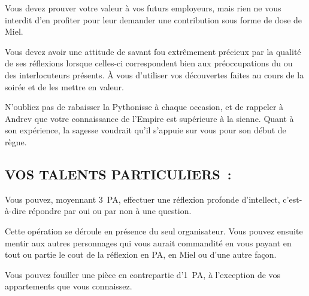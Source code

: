 \documentclass[14pt,twocolumn]{extarticle}
\begin{document}
Vous devez prouver votre valeur à vos futurs employeurs, mais rien ne vous
interdit d'en profiter pour leur demander une contribution sous forme de dose
de Miel.

Vous devez avoir une attitude de savant fou extrêmement précieux par la qualité
de ses réflexions lorsque celles-ci correspondent bien aux préoccupations du ou
des interlocuteurs présents. À vous d'utiliser vos découvertes faites au cours
de la soirée et de les mettre en valeur.

N'oubliez pas de rabaisser la Pythonisse à chaque occasion, et de rappeler à
Andrev que votre connaissance de l'Empire est supérieure à la sienne. Quant à
son expérience, la sagesse voudrait qu'il s'appuie sur vous pour son début de
règne.

\subsection{VOS TALENTS PARTICULIERS~:}

Vous pouvez, moyennant 3~PA, effectuer une réflexion profonde d'intellect,
c'est-à-dire répondre par oui ou par non à une question.

Cette opération se déroule en présence du seul organisateur. Vous pouvez
ensuite mentir aux autres personnages qui vous aurait commandité en vous
payant en tout ou partie le cout de la réflexion en PA, en Miel ou d'une autre
façon.

Vous pouvez fouiller une pièce en contrepartie d'1~PA, à l'exception de vos
appartements que vous connaissez.
\end{document}
